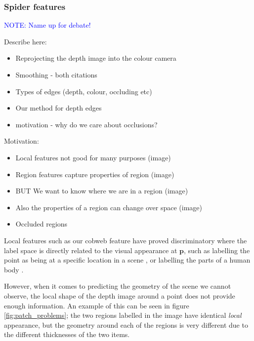 \documentclass[10pt,twocolumn,letterpaper]{article}
\makeatletter
\renewcommand*{\eg}{e.g.\@\xspace}
\newcommand{\point}{\mathbf{p}}
\newcommand{\note}[1]{\textcolor{blue}{NOTE: #1}}
\makeatother
\begin{document}
\subsubsection{Spider features }
\note{Name up for debate!}

Describe here:
\begin{itemize}
\item Reprojecting the depth image into the colour camera
\item Smoothing - both citations
\item Types of edges (depth, colour, occluding etc)
\item Our method for depth edges
\item motivation - why do we care about occlusions?
\end{itemize}

Motivation:
\begin{itemize}
\item Local features not good for many purposes (image)
\item Region features capture properties of region (image)
\item BUT We want to know where we are in a region  (image)
\item Also the properties of a region can change over space (image)
\item Occluded regions
\end{itemize}





Local features such as our cobweb feature have proved discriminatory where the label space is directly related to the visual appearance at $\point$, such as labelling the point as being at a specific location in a scene \cite{}, or labelling the parts of a human body \cite{shotton-cvpr-2011}.

However, when it comes to predicting the geometry of the scene we cannot observe, the local shape of the depth image around a point does not provide enough information. 
An example of this can be seen in figure \ref{fig:patch_problems}; the two regions labelled in the image have identical \emph{local} appearance, but the geometry around each of the regions is very different due to the different thicknesses of the two items.
\end{document}
